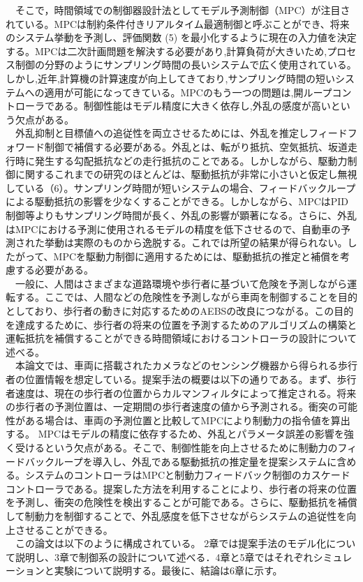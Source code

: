 　そこで，時間領域での制御器設計法としてモデル予測制御（MPC）が注目されている。MPCは制約条件付きリアルタイム最適制御と呼ぶことができ、将来のシステム挙動を予測し、評価関数 (5) を最小化するように現在の入力値を決定する。MPCは二次計画問題を解決する必要があり,計算負荷が大きいため,プロセス制御の分野のようにサンプリング時間の長いシステムで広く使用されている。しかし,近年,計算機の計算速度が向上してきており,サンプリング時間の短いシステムへの適用が可能になってきている。MPCのもう一つの問題は,開ループコントローラである。制御性能はモデル精度に大きく依存し,外乱の感度が高いという欠点がある。\\
　外乱抑制と目標値への追従性を両立させるためには、外乱を推定しフィードフォワード制御で補償する必要がある。外乱とは、転がり抵抗、空気抵抗、坂道走行時に発生する勾配抵抗などの走行抵抗のことである。しかしながら、駆動力制御に関するこれまでの研究のほとんどは、駆動抵抗が非常に小さいと仮定し無視している（6）。サンプリング時間が短いシステムの場合、フィードバックループによる駆動抵抗の影響を少なくすることができる。しかしながら、MPCはPID制御等よりもサンプリング時間が長く、外乱の影響が顕著になる。さらに、外乱はMPCにおける予測に使用されるモデルの精度を低下させるので、自動車の予測された挙動は実際のものから逸脱する。これでは所望の結果が得られない。したがって、MPCを駆動力制御に適用するためには、駆動抵抗の推定と補償を考慮する必要がある。\\
　一般に、人間はさまざまな道路環境や歩行者に基づいて危険を予測しながら運転する。ここでは、人間などの危険性を予測しながら車両を制御することを目的としており、歩行者の動きに対応するためのAEBSの改良につながる。この目的を達成するために、歩行者の将来の位置を予測するためのアルゴリズムの構築と運転抵抗を補償することができる時間領域におけるコントローラの設計について述べる。\\
　本論文では、車両に搭載されたカメラなどのセンシング機器から得られる歩行者の位置情報を想定している。提案手法の概要は以下の通りである。まず、歩行者速度は、現在の歩行者の位置からカルマンフィルタによって推定される。将来の歩行者の予測位置は、一定期間の歩行者速度の値から予測される。衝突の可能性がある場合は、車両の予測位置と比較してMPCにより制動力の指令値を算出する。 MPCはモデルの精度に依存するため、外乱とパラメータ誤差の影響を強く受けるという欠点がある。そこで、制御性能を向上させるために制動力のフィードバックループを導入し、外乱である駆動抵抗の推定量を提案システムに含める。システムのコントローラはMPCと制動力フィードバック制御のカスケードコントローラである。提案した方法を利用することにより、歩行者の将来の位置を予測し、衝突の危険性を検出することが可能である。さらに、駆動抵抗を補償して制動力を制御することで、外乱感度を低下させながらシステムの追従性を向上させることができる。\\
　この論文は以下のように構成されている。 2章では提案手法のモデル化について説明し、3章で制御系の設計について述べる．4章と5章ではそれぞれシミュレーションと実験について説明する。最後に、結論は6章に示す。\\

